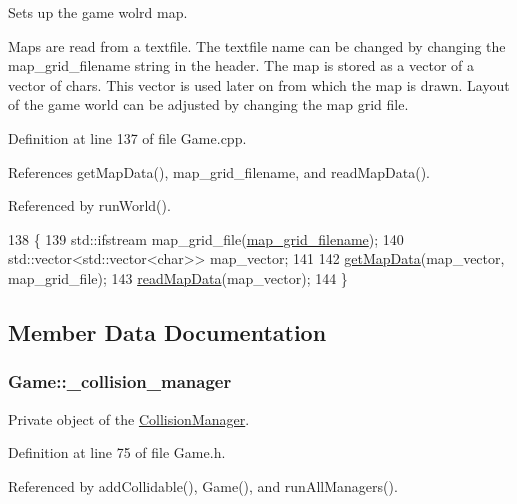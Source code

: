 Sets up the game wolrd map. 

Maps are read from a textfile. The textfile name can be changed by changing the map\-\_\-grid\-\_\-filename string in the header. The map is stored as a vector of a vector of chars. This vector is used later on from which the map is drawn. Layout of the game world can be adjusted by changing the map grid file. 

Definition at line 137 of file Game.\-cpp.



References get\-Map\-Data(), map\-\_\-grid\-\_\-filename, and read\-Map\-Data().



Referenced by run\-World().


\begin{DoxyCode}
138 \{
139     std::ifstream map\_grid\_file(\hyperlink{classGame_a3fe27799b59753fa9d7d0249b17fc64b}{map\_grid\_filename});
140     std::vector<std::vector<char>> map\_vector;
141 
142     \hyperlink{classGame_ad43265203e4e3e90ee91eb1fedbc06d4}{getMapData}(map\_vector, map\_grid\_file);
143     \hyperlink{classGame_a742dfb46a327c277b5b5711052919d21}{readMapData}(map\_vector);
144 \}
\end{DoxyCode}


\subsection{Member Data Documentation}
\hypertarget{classGame_a434f5c076c3abc86944fb02e86edc432}{
\subsubsection[{\-\_\-collision\-\_\-manager}]{ Game\-::\-\_\-collision\-\_\-manager\hspace{0.3cm}{\ttfamily [private]}}}\label{classGame_a434f5c076c3abc86944fb02e86edc432}


Private object of the \hyperlink{classCollisionManager}{Collision\-Manager}. 



Definition at line 75 of file Game.\-h.



Referenced by add\-Collidable(), Game(), and run\-All\-Managers().

